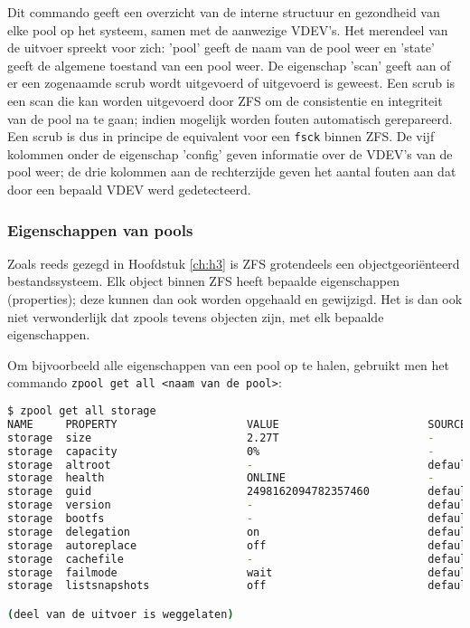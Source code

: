 Dit commando geeft een overzicht van de interne structuur en gezondheid van elke pool op het systeem, samen met de aanwezige VDEV's. Het merendeel van de uitvoer spreekt voor zich: 'pool' geeft de naam van de pool weer en 'state' geeft de algemene toestand van een pool weer. De eigenschap 'scan' geeft aan of er een zogenaamde scrub wordt uitgevoerd of uitgevoerd is geweest. Een scrub is een scan die kan worden uitgevoerd door ZFS om de consistentie en integriteit van de pool na te gaan; indien mogelijk worden fouten automatisch gerepareerd. Een scrub is dus in principe de equivalent voor een \texttt{fsck} binnen ZFS. De vijf kolommen onder de eigenschap 'config' geven informatie over de VDEV's van de pool weer; de drie kolommen aan de rechterzijde geven het aantal fouten aan dat door een bepaald VDEV werd gedetecteerd.

\subsubsection{Eigenschappen van pools}

Zoals reeds gezegd in Hoofdstuk \ref{ch:h3} is ZFS grotendeels een objectgeoriënteerd bestandssysteem. Elk object binnen ZFS heeft bepaalde eigenschappen (properties); deze kunnen dan ook worden opgehaald en gewijzigd. Het is dan ook niet verwonderlijk dat zpools tevens objecten zijn, met elk bepaalde eigenschappen.

Om bijvoorbeeld alle eigenschappen van een pool op te halen, gebruikt men het commando \texttt{zpool get all <naam van de pool>}:

\begin{lstlisting}[language=bash,style=command_style]
$ zpool get all storage
NAME     PROPERTY                    VALUE                       SOURCE
storage  size                        2.27T                       -
storage  capacity                    0%                          -
storage  altroot                     -                           default
storage  health                      ONLINE                      -
storage  guid                        2498162094782357460         default
storage  version                     -                           default
storage  bootfs                      -                           default
storage  delegation                  on                          default
storage  autoreplace                 off                         default
storage  cachefile                   -                           default
storage  failmode                    wait                        default
storage  listsnapshots               off                         default

(deel van de uitvoer is weggelaten)
\end{lstlisting}

